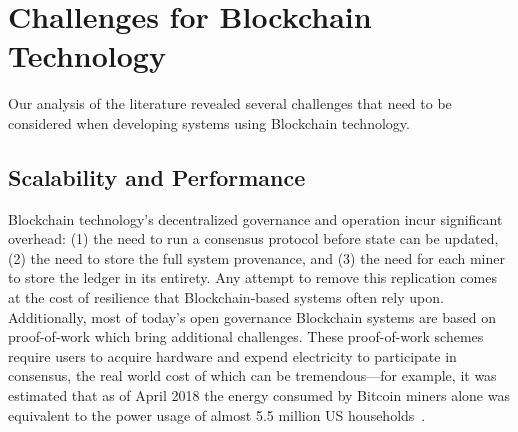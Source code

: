 \section{Challenges for Blockchain Technology}
\label{sec:challenges}

Our analysis of the literature revealed several challenges that need to be considered when developing systems using Blockchain technology.

\subsection{Scalability and Performance}
Blockchain technology's decentralized governance and operation incur significant overhead: (1) the need to run a consensus protocol before state can be updated, (2) the need to store the full system provenance, and (3) the need for each miner to store the ledger in its entirety. Any attempt to remove this replication comes at the cost of resilience that Blockchain-based systems often rely upon.
Additionally, most of today's open governance Blockchain systems are based on proof-of-work which bring additional challenges.
These proof-of-work schemes require users to acquire hardware and expend electricity to participate in consensus, the real world cost of which can be tremendous---for example, it was estimated that as of April 2018 the energy consumed by Bitcoin miners alone was equivalent to the power usage of almost 5.5 million US households~\cite{Digiconomist}.


